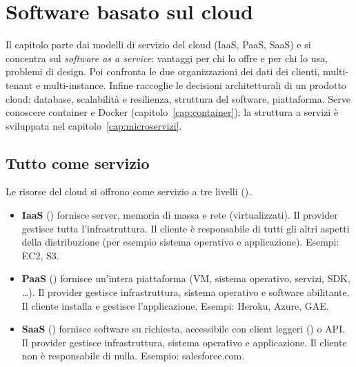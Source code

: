 \chapter{Software basato sul cloud}
\label{cap:cloud}

\begin{inbreve}
Il capitolo parte dai modelli di servizio del cloud (IaaS, PaaS, SaaS) e si concentra sul \emph{software as a service}:
vantaggi per chi lo offre e per chi lo usa, problemi di design. Poi confronta le due organizzazioni dei dati dei clienti,
multi-tenant e multi-instance. Infine raccoglie le decisioni architetturali di un prodotto cloud: database,
scalabilità e resilienza, struttura del software, piattaforma. Serve conoscere container e Docker
(capitolo~\ref{cap:container}); la struttura a servizi è sviluppata nel capitolo~\ref{cap:microservizi}.
\end{inbreve}

\section{Tutto come servizio}
\label{sec:cloud-aas}

Le risorse del cloud si offrono come servizio a tre livelli ().

\begin{definizione}
\begin{itemize}
  \item \textbf{IaaS} () fornisce server, memoria di massa e rete (virtualizzati). Il provider
    gestisce tutta l'infrastruttura. Il cliente è responsabile di tutti gli altri aspetti della distribuzione (per
    esempio sistema operativo e applicazione). Esempi: EC2, S3.
  \item \textbf{PaaS} () fornisce un'intera piattaforma (VM, sistema operativo, servizi,
    SDK, \dots). Il provider gestisce infrastruttura, sistema operativo e software abilitante. Il cliente installa e
    gestisce l'applicazione. Esempi: Heroku, Azure, GAE.
  \item \textbf{SaaS} () fornisce software su richiesta, accessibile con client leggeri () o
    API. Il provider gestisce infrastruttura, sistema operativo e applicazione. Il cliente non è responsabile di nulla.
    Esempio: salesforce.com.
\end{itemize}
\end{definizione}

